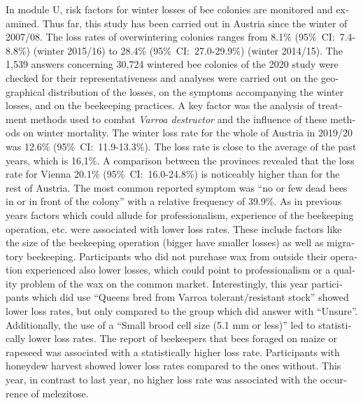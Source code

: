 \begin{otherlanguage}{english}
In module U, risk factors for winter losses of bee colonies are monitored and examined. Thus far, this study has been carried out in Austria since the winter of 2007/08. The loss rates of overwintering colonies ranges from 8.1\% (95\%~CI:~7.4-8.8\%) (winter 2015/16) to 28.4\% (95\%~CI:~27.0-29.9\%) (winter 2014/15). 
\newline
The 1,539 answers concerning 30,724 wintered bee colonies of the 2020 study were checked for their representativeness and analyses were carried out on the geographical distribution of the losses, on the symptoms accompanying the winter losses, and on the beekeeping practices. A key factor was the analysis of treatment methods used to combat \textit{Varroa destructor} and the influence of these methods on winter mortality. 
\newline
The winter loss rate for the whole of Austria in 2019/20 was 12.6\% (95\%~CI:~11.9-13.3\%). The loss rate is close to the average of the past years, which is 16,1\%. A comparison between the provinces revealed that the loss rate for Vienna 20.1\% (95\%~CI:~16.0-24.8\%) is noticeably higher than for the rest of Austria. The most common reported symptom was \enquote{no or few dead bees in or in front of the colony} with a relative frequency of 39.9\%.
\newline
As in previous years factors which could allude for professionalism, experience of the beekeeping operation, etc. were associated with lower loss rates. These include factors like the size of the beekeeping operation (bigger have smaller losses) as well as migratory beekeeping. Participants who did not purchase wax from outside their operation experienced also lower losses, which could point to professionalism or a quality problem of the wax on the common market.
\newline
Interestingly, this year participants which did use \enquote{Queens bred from Varroa tolerant/resistant stock} showed lower loss rates, but only compared to the group which did answer with \enquote{Unsure}. Additionally, the use of a \enquote{Small brood cell size (5.1 mm or less)} led to statistically lower loss rates.
\newline
The report of beekeepers that bees foraged on maize or rapeseed was associated with a statistically higher loss rate. Participants with honeydew harvest showed lower loss rates compared to the ones without. This year, in contrast to last year, no higher loss rate was associated with the occurrence of melezitose.

\end{otherlanguage}
